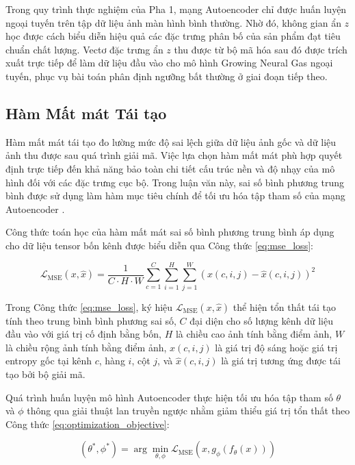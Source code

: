 Trong quy trình thực nghiệm của Pha 1, mạng Autoencoder chỉ được huấn luyện ngoại tuyến trên tập dữ liệu ảnh màn hình bình thường. Nhờ đó, không gian ẩn $z$ học được cách biểu diễn hiệu quả các đặc trưng phân bố của sản phẩm đạt tiêu chuẩn chất lượng. Vectơ đặc trưng ẩn $z$ thu được từ bộ mã hóa sau đó được trích xuất trực tiếp để làm dữ liệu đầu vào cho mô hình Growing Neural Gas ngoại tuyến, phục vụ bài toán phân định ngưỡng bất thường ở giai đoạn tiếp theo.

\subsection{Hàm Mất mát Tái tạo}

Hàm mất mát tái tạo đo lường mức độ sai lệch giữa dữ liệu ảnh gốc và dữ liệu ảnh thu được sau quá trình giải mã. Việc lựa chọn hàm mất mát phù hợp quyết định trực tiếp đến khả năng bảo toàn chi tiết cấu trúc nền và độ nhạy của mô hình đối với các đặc trưng cục bộ. Trong luận văn này, sai số bình phương trung bình được sử dụng làm hàm mục tiêu chính để tối ưu hóa tập tham số của mạng Autoencoder \cite{hinton2006reducing}.

Công thức toán học của hàm mất mát sai số bình phương trung bình áp dụng cho dữ liệu tensor bốn kênh được biểu diễn qua Công thức \ref{eq:mse_loss}:

\begin{equation}
\mathcal{L}_{\text{MSE}}(x, \hat{x}) = \frac{1}{C \cdot H \cdot W} \sum_{c=1}^{C} \sum_{i=1}^{H} \sum_{j=1}^{W} \left( x(c,i,j) - \hat{x}(c,i,j) \right)^2
\label{eq:mse_loss}
\end{equation}

Trong Công thức \ref{eq:mse_loss}, ký hiệu $\mathcal{L}_{\text{MSE}}(x, \hat{x})$ thể hiện tổn thất tái tạo tính theo trung bình bình phương sai số, $C$ đại diện cho số lượng kênh dữ liệu đầu vào với giá trị cố định bằng bốn, $H$ là chiều cao ảnh tính bằng điểm ảnh, $W$ là chiều rộng ảnh tính bằng điểm ảnh, $x(c,i,j)$ là giá trị độ sáng hoặc giá trị entropy gốc tại kênh $c$, hàng $i$, cột $j$, và $\hat{x}(c,i,j)$ là giá trị tương ứng được tái tạo bởi bộ giải mã.

Quá trình huấn luyện mô hình Autoencoder thực hiện tối ưu hóa tập tham số $\theta$ và $\phi$ thông qua giải thuật lan truyền ngược nhằm giảm thiểu giá trị tổn thất theo Công thức \ref{eq:optimization_objective}:

\begin{equation}
(\theta^*, \phi^*) = \arg\min_{\theta, \phi} \mathcal{L}_{\text{MSE}}\left(x, g_{\phi}(f_{\theta}(x))\right)
\label{eq:optimization_objective}
\end{equation}

